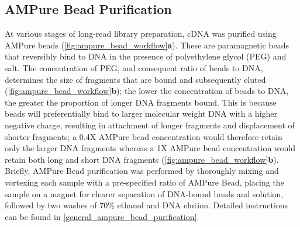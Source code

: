 \subsection{AMPure Bead Purification} 
\label{section:ch2_AMPure_explanation} 
At various stages of long-read library preparation, cDNA was purified using AMPure beads (\cref{fig:ampure_bead_workflow}\textbf{a}). These are paramagnetic beads that reversibly bind to DNA in the presence of polyethylene glycol (PEG) and salt. The concentration of PEG, and consequent ratio of beads to DNA, determines the size of fragments that are bound and subsequently eluted (\cref{fig:ampure_bead_workflow}\textbf{b}); the lower the concentration of beads to DNA, the greater the proportion of longer DNA fragments bound. This is because beads will preferentially bind to larger molecular weight DNA with a higher negative charge, resulting in attachment of longer fragments and displacement of shorter fragments; a 0.4X AMPure bead concentration would therefore retain only the larger DNA fragments whereas a 1X AMPure bead concentration would retain both long and short DNA fragments (\cref{fig:ampure_bead_workflow}\textbf{b}). Briefly, AMPure Bead purification was performed by thoroughly mixing and vortexing each sample with a pre-specified ratio of AMPure Bead, placing the sample on a magnet for clearer separation of DNA-bound beads and solution, followed by two washes of 70\% ethanol and DNA elution. Detailed instructions can be found in \cref{general_ampure_bead_purification}.

